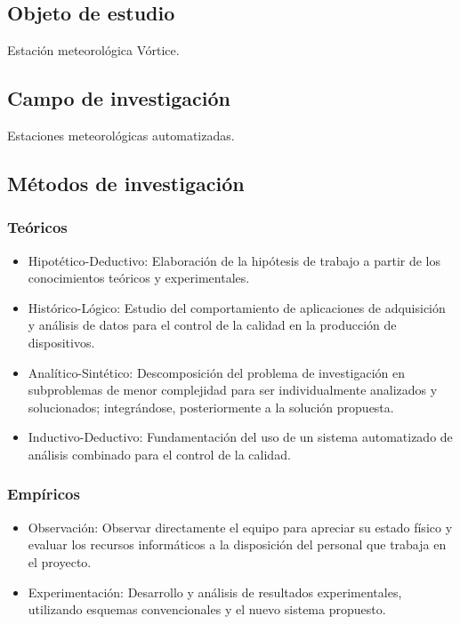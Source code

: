 \documentclass[conference, a4paper]{IEEEtran}
\begin{document}
\subsection{Objeto de estudio}\label{subsec:objeto-de-estudio}
Estación meteorológica Vórtice.

\subsection{Campo de investigación}\label{subsec:campo-de-investigacion}
Estaciones meteorológicas automatizadas.

\subsection{Métodos de investigación}\label{subsec:metodos-de-investigacion}

\subsubsection{Teóricos}
\begin{itemize}
	\item Hipotético-Deductivo: Elaboración de la hipótesis de trabajo a partir de los
	      conocimientos teóricos y experimentales.
	\item Histórico-Lógico: Estudio del comportamiento de aplicaciones de adquisición y
	      análisis de datos para el control de la calidad en la producción de
	      dispositivos.
	\item Analítico-Sintético: Descomposición del problema de investigación en
	      subproblemas de menor complejidad para ser individualmente analizados y
	      solucionados;
	      integrándose, posteriormente a la solución propuesta.
	\item Inductivo-Deductivo: Fundamentación del uso de un sistema automatizado de
	      análisis combinado para el control de la calidad.
\end{itemize}

\subsubsection{Empíricos}
\begin{itemize}
	\item Observación: Observar directamente el equipo para apreciar su estado físico y
	      evaluar los recursos informáticos a la disposición del personal que trabaja en
	      el proyecto.
	\item Experimentación: Desarrollo y análisis de resultados experimentales, utilizando
	      esquemas convencionales y el nuevo sistema propuesto.
\end{itemize}
\end{document}
